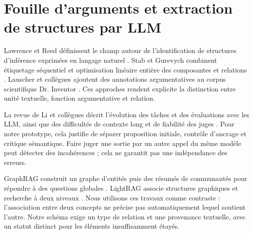 \section{Fouille d'arguments et extraction de structures par LLM}
Lawrence et Reed définissent le champ autour de l'identification de structures d'inférence exprimées en langage naturel \cite{ref05}. Stab et Gurevych combinent étiquetage séquentiel et optimisation linéaire entière des composantes et relations \cite{ref07}. Lauscher et collègues ajoutent des annotations argumentatives au corpus scientifique Dr. Inventor \cite{ref08}. Ces approches rendent explicite la distinction entre unité textuelle, fonction argumentative et relation.

La revue de Li et collègues décrit l'évolution des tâches et des évaluations avec les LLM, ainsi que des difficultés de contexte long et de fiabilité des juges \cite{ref06}. Pour notre prototype, cela justifie de séparer proposition initiale, contrôle d'ancrage et critique sémantique. Faire juger une sortie par un autre appel du même modèle peut détecter des incohérences ; cela ne garantit pas une indépendance des erreurs.

GraphRAG construit un graphe d'entités puis des résumés de communautés pour répondre à des questions globales \cite{ref13}. LightRAG associe structures graphiques et recherche à deux niveaux \cite{ref14}. Nous utilisons ces travaux comme contraste : l'association entre deux concepts ne précise pas automatiquement lequel soutient l'autre. Notre schéma exige un type de relation et une provenance textuelle, avec un statut distinct pour les éléments insuffisamment étayés.
